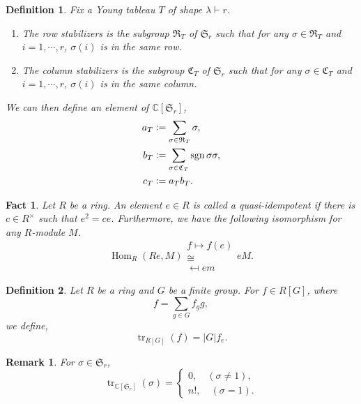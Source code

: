 \documentclass{article}
\newtheorem{definition}{Definition}[section]
\newtheorem{remark}{Remark}[section]
\newtheorem{fact}{Fact}[section]
\numberwithin{equation}{theorem}
\DeclareMathOperator{\tr}{tr}
\DeclareMathOperator{\Hom}{Hom}
\DeclareMathOperator{\sgn}{sgn}
\newcommand{\defeq}{\vcentcolon=}
\newcommand{\C}[0]{\mathbb{C}}
\newcommand{\fS}[0]{\mathfrak{S}}
\begin{document}
\begin{definition}
    Fix a Young tableau $T$ of shape $\lambda\vdash r$. 
    \begin{enumerate}[1).]
        \item The row stabilizers is the subgroup $\mathfrak{R}_T$ of $\mathfrak{S}_r$ such that for any $\sigma\in\mathfrak{R}_T$ and $i=1,\cdots,r$, $\sigma(i)$ is in the same row.
        \item The column stabilizers is the subgroup $\mathfrak{C}_T$ of $\mathfrak{S}_r$ such that for any $\sigma\in\mathfrak{C}_T$ and $i=1,\cdots,r$, $\sigma(i)$ is in the same column.
    \end{enumerate}
    We can then define an element of $\C[\mathfrak{S}_r]$,
    \begin{align*}
        a_T &\defeq \sum_{\sigma\in\mathfrak{R}_T}\sigma,\\
        b_T &\defeq \sum_{\sigma\in\mathfrak{C}_T}\sgn\sigma\sigma,\\
        c_T & \defeq a_Tb_T.
    \end{align*}
\end{definition}
\begin{fact}
    \label{fact_quasi_idempotent}
Let $R$ be a ring. An element $e\in R$ is called a quasi-idempotent if there is $c\in R^\times$ such that $e^2 = ce$. Furthermore, we have the following isomorphism for any $R$-module $M$.
\begin{equation*}
    \Hom_R(Re,M)\mathrel{\substack{f\mapsto f(e)\\\cong\\ [re\mapsto rem]\mapsfrom em}}  eM.
\end{equation*}
\end{fact}
\begin{definition}
    Let $R$ be a ring and $G$ be a finite group. For $f\in R[G]$, where 
    \begin{equation*}
        f = \sum_{g\in G}f_g g,
    \end{equation*}
    we define,
    \begin{equation*}
        \tr_{R[G]}(f) = \vert G\vert f_e.
    \end{equation*}
\end{definition}
\begin{remark}For $\sigma\in\fS_r$,
    \begin{equation*}
        \tr_{\C[\fS_r]}(\sigma) = \begin{cases}
            0,\quad(\sigma\not=1),\\
            n!,\quad(\sigma=1).
        \end{cases}
    \end{equation*}
\end{remark}
\end{document}

